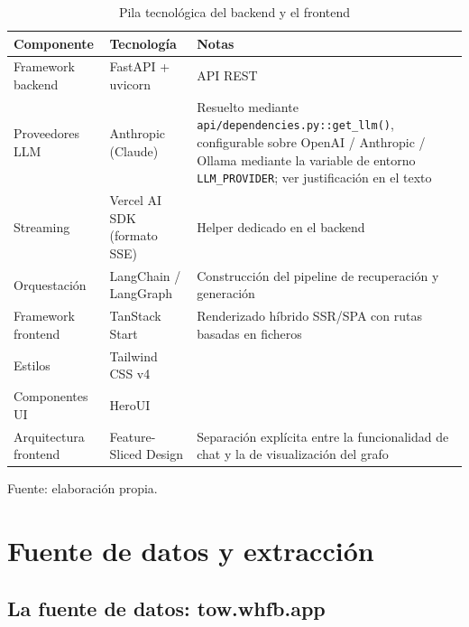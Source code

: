 \documentclass[11pt,a4paper,spanish]{book}
\numberwithin{equation}{chapter}
\numberwithin{figure}{chapter}
\numberwithin{table}{chapter}
\begin{document}
\begin{table}[h]
\centering
\begin{tabular}{|p{3.3cm}|p{3.3cm}|p{5.7cm}|}
	\hline
	\textbf{Componente} & \textbf{Tecnología} & \textbf{Notas} \\
	\hline
	Framework backend & FastAPI + uvicorn & API REST \\
	\hline
	Proveedores LLM & Anthropic (Claude) & Resuelto mediante \texttt{api/dependencies.py::get\_llm()}, configurable sobre OpenAI / Anthropic / Ollama mediante la variable de entorno \texttt{LLM\_PROVIDER}; ver justificación en el texto \\
	\hline
	Streaming & Vercel AI SDK (formato SSE) & Helper dedicado en el backend \\
	\hline
	Orquestación & LangChain / LangGraph & Construcción del pipeline de recuperación y generación \\
	\hline
	Framework frontend & TanStack Start & Renderizado híbrido SSR/SPA con rutas basadas en ficheros \\
	\hline
	Estilos & Tailwind CSS v4 & \\
	\hline
	Componentes UI & HeroUI & \\
	\hline
	Arquitectura frontend & Feature-Sliced Design & Separación explícita entre la funcionalidad de chat y la de visualización del grafo \\
	\hline
\end{tabular}
\caption{Pila tecnológica del backend y el frontend}
\label{tab:stack-backend-frontend}
{\footnotesize\centering Fuente: elaboración propia.\par}
\end{table}

\section{Fuente de datos y extracción}
\label{sec:pipeline-datos}

\subsection{La fuente de datos: tow.whfb.app}
\end{document}
